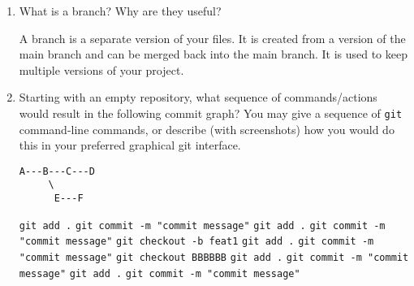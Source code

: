 \documentclass[10pt,twocolumn]{article}
\begin{document}
\begin{enumerate}
\item What is a branch? Why are they useful?\newline
\par A branch is a separate version of your files. It is created from a version of the main branch and can be merged back into the main branch. It is used to keep multiple versions of your project. \newline
\item Starting with an empty repository, what sequence of commands/actions would result in the following commit graph? You may give a sequence of \texttt{git} command-line commands, or describe (with screenshots) how you would do this in your preferred graphical git interface.\newline
\begin{verbatim}
A---B---C---D
     \
      E---F
\end{verbatim}
\par 
\texttt{git add .}\newline
\texttt{git commit -m "commit message"}\newline
\texttt{git add .}\newline
\texttt{git commit -m "commit message"}\newline
\texttt{git checkout -b feat1}\newline
\texttt{git add .}\newline
\texttt{git commit -m "commit message"}\newline
\texttt{git checkout BBBBBB}\newline
\texttt{git add .}\newline
\texttt{git commit -m "commit message"}\newline
\texttt{git add .}\newline
\texttt{git commit -m "commit message"}\newline


\end{enumerate}
\end{document}
